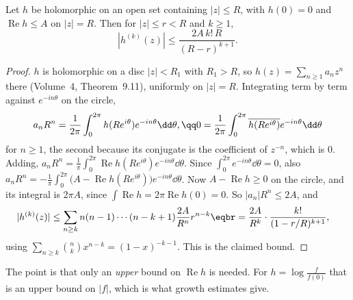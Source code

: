 \begin{lemma}\label{lem:borel}
Let $h$ be holomorphic on an open set containing $|z|\le R$, with $h(0)=0$ and $\operatorname{Re}h\le A$ on $|z|=R$. Then for $|z|\le r<R$ and $k\ge1$,
\[
|h^{(k)}(z)|\le\frac{2A\,k!\,R}{(R-r)^{k+1}}.
\]
\end{lemma}
\begin{proof}
$h$ is holomorphic on a disc $|z|<R_1$ with $R_1>R$, so $h(z)=\sum_{n\ge1}a_nz^n$ there (Volume~4, Theorem~9.11), uniformly on $|z|=R$. Integrating term by term against $e^{-in\theta}$ on
the circle,
\[
\begin{gathered}a_nR^n=\frac1{2\pi}\int_0^{2\pi}h(Re^{i\theta})e^{-in\theta}\dd\theta,\qq0=\frac1{2\pi}\int_0^{2\pi}\overline{h(Re^{i\theta})}e^{-in\theta}\dd\theta\end{gathered}
\]
for $n\ge1$, the second because its conjugate is the coefficient of $z^{-n}$, which is $0$. Adding, $a_nR^n=\frac1\pi\int_0^{2\pi}\operatorname{Re}h(Re^{i\theta})e^{-in\theta}\dd\theta$. Since
$\int_0^{2\pi}e^{-in\theta}\dd\theta=0$, also $a_nR^n=-\frac1\pi\int_0^{2\pi}\bigl(A-\operatorname{Re}h(Re^{i\theta})\bigr)e^{-in\theta}\dd\theta$. Now $A-\operatorname{Re}h\ge0$ on the circle, and its integral is
$2\pi A$, since $\int\operatorname{Re}h=2\pi\operatorname{Re}h(0)=0$. So $|a_n|R^n\le2A$, and
\[
\begin{aligned}|h^{(k)}(z)|&\le\sum_{n\ge k}n(n-1)\cdots(n-k+1)\frac{2A}{R^n}r^{n-k}\eqbr=\frac{2A}{R^k}\cdot\frac{k!}{(1-r/R)^{k+1}},\end{aligned}
\]
using $\sum_{n\ge k}\binom nkx^{n-k}=(1-x)^{-k-1}$. This is the claimed bound.
\end{proof}

The point is that only an \emph{upper} bound on $\operatorname{Re}h$ is needed. For $h=\log\frac{f}{f(0)}$ that is an upper bound on $|f|$, which is what growth estimates give.

